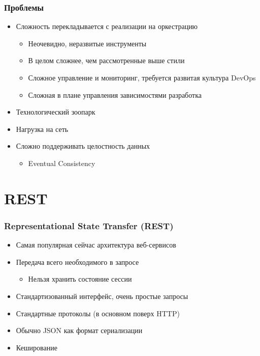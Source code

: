 \documentclass{../../slides-style}
\begin{document}
    \begin{frame}
        \frametitle{Проблемы}
        \begin{itemize}
            \item Сложность перекладывается с реализации на оркестрацию
            \begin{itemize}
                \item Неочевидно, неразвитые инструменты
                \item В целом сложнее, чем рассмотренные выше стили
                \item Сложное управление и мониторинг, требуется развитая культура DevOps
                \item Сложная в плане управления зависимостями разработка
            \end{itemize}
            \item Технологический зоопарк
            \item Нагрузка на сеть
            \item Сложно поддерживать целостность данных
            \begin{itemize}
                \item Eventual Consistency
            \end{itemize}
        \end{itemize}
    \end{frame}

    \section{REST}

    \begin{frame}
        \frametitle{Representational State Transfer (REST)}
        \begin{itemize}
            \item Самая популярная сейчас архитектура веб-сервисов
            \item Передача всего необходимого в запросе
            \begin{itemize}
                \item Нельзя хранить состояние сессии
            \end{itemize}
            \item Стандартизованный интерфейс, очень простые запросы
            \item Стандартные протоколы (в основном поверх HTTP)
            \item Обычно JSON как формат сериализации
            \item Кеширование
        \end{itemize}
    \end{frame}
\end{document}
